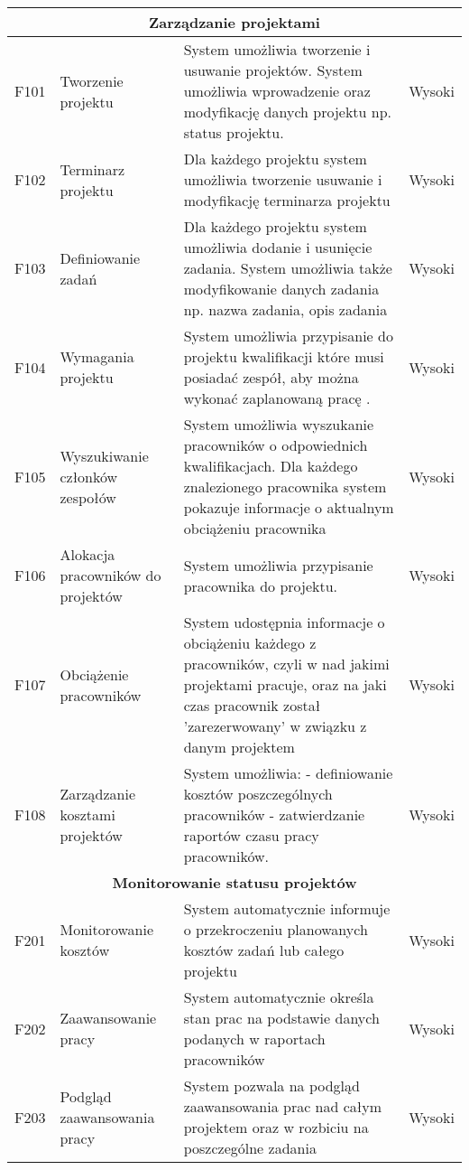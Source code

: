 \begin{adjustwidth}{2em}{0pt}
\begin{tabularx}{\textwidth}{|c|X|X|c|}
\multicolumn{4}{|c|}{\textbf{Zarządzanie projektami}} \\
\hline 
F101 &  Tworzenie projektu & System umożliwia tworzenie i usuwanie projektów. System umożliwia wprowadzenie oraz modyfikację danych projektu np. status projektu. & Wysoki \\ 
\hline
F102 & Terminarz projektu & Dla każdego projektu system umożliwia tworzenie usuwanie i modyfikację terminarza projektu & Wysoki \\
\hline 
F103 & Definiowanie zadań & Dla każdego projektu system umożliwia dodanie i usunięcie zadania. System umożliwia także modyfikowanie danych zadania np. nazwa zadania, opis zadania & Wysoki \\ 
\hline 
F104 & Wymagania projektu & System umożliwia przypisanie do projektu kwalifikacji które musi posiadać zespół, aby można wykonać zaplanowaną pracę . & Wysoki \\ 
\hline 
F105 & Wyszukiwanie członków zespołów & System umożliwia wyszukanie pracowników o odpowiednich kwalifikacjach. Dla każdego znalezionego pracownika system pokazuje informacje o aktualnym obciążeniu pracownika& Wysoki \\ 
\hline 
F106 & Alokacja pracowników do projektów & System umożliwia przypisanie pracownika do projektu. & Wysoki \\ 
\hline 
F107 & Obciążenie pracowników & System udostępnia informacje o obciążeniu każdego z pracowników, czyli w nad jakimi projektami pracuje, oraz na jaki czas pracownik został 'zarezerwowany' w związku z danym projektem & Wysoki \\ 
\hline 
F108 & Zarządzanie kosztami projektów & System umożliwia: \newline
- definiowanie kosztów poszczególnych pracowników \newline
- zatwierdzanie raportów czasu pracy pracowników. & Wysoki \\
\hline
\multicolumn{4}{|c|}{\textbf{Monitorowanie statusu projektów}} \\
\hline 
F201 & Monitorowanie kosztów & System automatycznie informuje o przekroczeniu planowanych kosztów zadań lub całego projektu & Wysoki \\ 
\hline 
F202 & Zaawansowanie pracy & System automatycznie określa stan prac na podstawie danych podanych w raportach pracowników & Wysoki \\
\hline 
F203 & Podgląd zaawansowania pracy & System pozwala na podgląd zaawansowania prac nad całym projektem oraz w rozbiciu na poszczególne zadania & Wysoki \\

\end{tabularx}
\end{adjustwidth}
